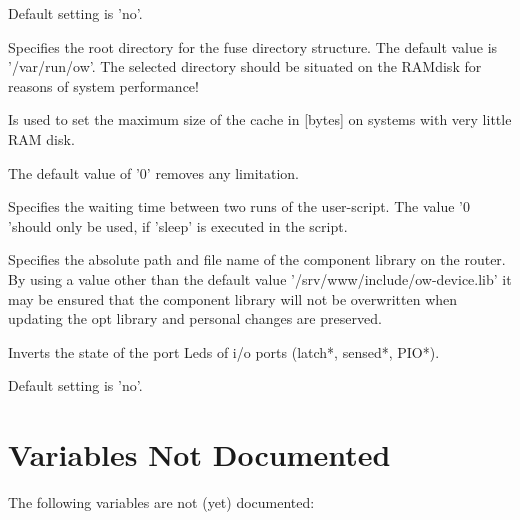 \begin{description}
 Default setting is 'no'.

Specifies the root directory for the fuse directory structure.
The default value is '/var/run/ow'. The selected directory
should be situated on the RAMdisk for reasons of system performance!

Is used to set the maximum size of the cache in
[bytes] on systems with very little RAM disk.

  The default value of '0' removes any limitation.

Specifies the waiting time between two runs
of the user-script. The value '0 'should only be used, if
'sleep' is executed in the script.

Specifies the absolute path and file name of the component library
on the router. By using a value other than the default value
'/srv/www/include/ow-device.lib' it may be ensured that
the component library will not be overwritten when updating
the opt library and personal changes are preserved.

 Inverts the state of the port Leds of i/o ports (latch*,
sensed*, PIO*).

Default setting is 'no'.
\end{description}

\section{Variables Not Documented}

The following variables are not (yet) documented:
\begin{description}


\end{description}

